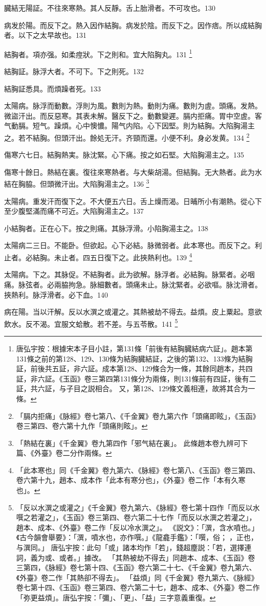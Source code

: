 臓結无陽証。不往來寒熱。其人反靜。舌上胎滑者。不可攻也。130

病发於陽。而反下之。熱入因作結胸。病发於陰。而反下之。因作痞。所以成結胸者。以下之太早故也。131

結胸者。項亦强。如柔痙狀。下之則和。宜大陷胸丸。131
	\footnote{
		唐弘宇按：根據宋本子目小註，第131條「前後有結胸臓結病六証」。趙本第131條之前的第128、129、130條为結胸臓結証，之後的第132、133條为結胸証，前後共五証，非六証。成本第128、129條合为一條，其餘同趙本，共四証，非六証。《玉函》卷三第四第131條分为兩條，則131條前有四証，後有二証，共六証，与子目之説相合。
		又，第128、129條文義相連，故將其合为一條。
	}

結胸証。脉浮大者。不可下。下之則死。132

結胸証悉具。而煩躁者死。133

太陽病。脉浮而動數。浮則为風。數則为熱。動則为痛。數則为虗。頭痛。发熱。微盜汗出。而反惡寒。其表未解。醫反下之。動數變遲。膈内拒痛。胃中空虗。客气動膈。短气。躁煩。心中懊憹。陽气内陷。心下因堅。則为結胸。大陷胸湯主之。若不結胸。但頭汗出。餘処无汗。齐頸而還。小便不利。身必发黄。134
	\footnote{
		「膈内拒痛」《脉經》卷七第八、《千金翼》卷九第六作「頭痛即眩」，《玉函》卷三第四、卷六第十九作「頭痛則眩」。
	}

傷寒六七日。結胸熱実。脉沈緊。心下痛。按之如石堅。大陷胸湯主之。135

傷寒十餘日。熱結在裏。復往來寒熱者。与大柴胡湯。但結胸。无大熱者。此为水結在胸脇。{\khaaitp 但}頭微汗出。大陷胸湯主之。136
	\footnote{
		「熱結在裏」《千金翼》卷九第四作「邪气結在裏」。
		此條趙本卷九辨可下篇、《外臺》卷二分作兩條。
	}

太陽病。重发汗而復下之。不大便五六日。舌上燥而渴。日晡所小有潮熱。從心下至少腹堅滿而痛不可近。大陷胸湯主之。137

小結胸者。正在心下。按之則痛。其脉浮滑。小陷胸湯主之。138

太陽病二三日。不能卧。但欲起。心下必結。脉微弱者。此本寒也。而反下之。利止者。必結胸。未止者。四五日復下之。此挾熱利也。139
	\footnote{
		「此本寒也」同《千金翼》卷九第六、《脉經》卷七第八、《玉函》卷三第四、卷六第十九，趙本、成本作「此本有寒分也」，《外臺》卷二作「本有久寒也」。
	}

太陽病。下之。其脉促。不結胸者。此为欲解。脉浮者。必結胸。脉緊者。必咽痛。脉弦者。必兩脇拘急。脉細數者。頭痛未止。脉沈緊者。必欲嘔。脉沈滑者。挾熱利。脉浮滑者。必下血。140

病在陽。当以汗解。反以水潠之或灌之。其熱被劫不得去。益煩。皮上粟起。意欲飲水。反不渴。宜服文蛤散。若不差。与五苓散。141
	\footnote{
		「反以水潠之或灌之」《千金翼》卷九第六、《脉經》卷七第十四作「而反以水噀之若灌之」，《玉函》卷三第四、卷六第二十七作「而反以水潠之若灌之」，趙本、成本、《外臺》卷二作「反以冷水潠之」。
		《説文》：「潠，含水噴也。」《古今韻會舉要》：「潠，噴水也，亦作噀。」《龍龕手鑑》：「噀，俗；{\sungtpii 𠹀}，正也，与潠同。」
		唐弘宇按：此句「或」諸本均作「若」，錢超塵説：「若，選擇連詞，義为或、或者。」據改。
		「其熱被劫不得去」同趙本、成本、《玉函》卷三第四，《脉經》卷七第十四、《玉函》卷六第二十七、《千金翼》卷九第六、《外臺》卷二作「其熱卻不得去」。
		「益煩」同《千金翼》卷九第六、《脉經》卷七第十四、《玉函》卷三第四、卷六第二十七，趙本、成本、《外臺》卷二作「弥更益煩」。唐弘宇按：「彌」、「更」、「益」三字意義重復。
	}

